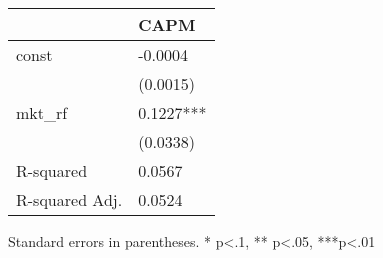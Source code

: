 \begin{table}
\caption{}
\label{}
\begin{center}
\begin{tabular}{ll}
\hline
               & CAPM       \\
\hline
const          & -0.0004    \\
               & (0.0015)   \\
mkt\_rf        & 0.1227***  \\
               & (0.0338)   \\
R-squared      & 0.0567     \\
R-squared Adj. & 0.0524     \\
\hline
\end{tabular}
\end{center}
\end{table}
\bigskip
Standard errors in parentheses. \newline 
* p<.1, ** p<.05, ***p<.01